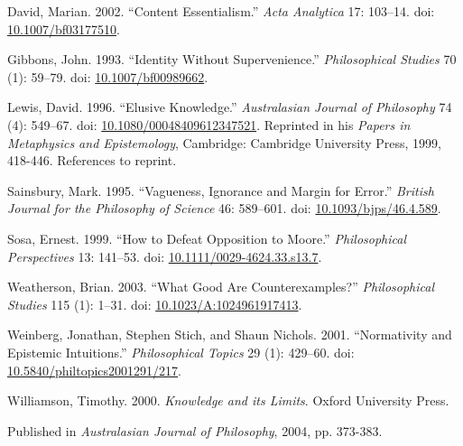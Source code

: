 \documentclass[
  10pt,
  letterpaper,
  DIV=11,
  numbers=noendperiod,
  twoside]{scrartcl}
\newlength{\cslhangindent}
\newenvironment{CSLReferences}[2] %
 {\begin{list}{}{%
  \setlength{\itemindent}{0pt}
  \setlength{\leftmargin}{0pt}
  \setlength{\parsep}{0pt}
  \ifodd #1
   \setlength{\leftmargin}{\cslhangindent}
   \setlength{\itemindent}{-1\cslhangindent}
  \fi
  \setlength{\itemsep}{#2\baselineskip}}}
 {\end{list}}
\begin{document}
\label{refs}
\begin{CSLReferences}{1}{0}
David, Marian. 2002. {``Content Essentialism.''} \emph{Acta Analytica}
17: 103--14. doi:
\href{https://doi.org/10.1007/bf03177510}{10.1007/bf03177510}.

Gibbons, John. 1993. {``Identity Without Supervenience.''}
\emph{Philosophical Studies} 70 (1): 59--79. doi:
\href{https://doi.org/10.1007/bf00989662}{10.1007/bf00989662}.

Lewis, David. 1996. {``Elusive Knowledge.''} \emph{Australasian Journal
of Philosophy} 74 (4): 549--67. doi:
\href{https://doi.org/10.1080/00048409612347521}{10.1080/00048409612347521}.
Reprinted in his \emph{Papers in Metaphysics and Epistemology},
Cambridge: Cambridge University Press, 1999, 418-446. References to
reprint.

Sainsbury, Mark. 1995. {``Vagueness, Ignorance and Margin for Error.''}
\emph{British Journal for the Philosophy of Science} 46: 589--601. doi:
\href{https://doi.org/10.1093/bjps/46.4.589}{10.1093/bjps/46.4.589}.

Sosa, Ernest. 1999. {``How to Defeat Opposition to Moore.''}
\emph{Philosophical Perspectives} 13: 141--53. doi:
\href{https://doi.org/10.1111/0029-4624.33.s13.7}{10.1111/0029-4624.33.s13.7}.

Weatherson, Brian. 2003. {``{What Good Are Counterexamples?}''}
\emph{Philosophical Studies} 115 (1): 1--31. doi:
\href{https://doi.org/10.1023/A:1024961917413}{10.1023/A:1024961917413}.

Weinberg, Jonathan, Stephen Stich, and Shaun Nichols. 2001.
{``Normativity and Epistemic Intuitions.''} \emph{Philosophical Topics}
29 (1): 429--60. doi:
\href{https://doi.org/10.5840/philtopics2001291/217}{10.5840/philtopics2001291/217}.

Williamson, Timothy. 2000. \emph{{Knowledge and its Limits}}. Oxford
University Press.

\end{CSLReferences}



\noindent Published in\emph{
Australasian Journal of Philosophy}, 2004, pp. 373-383.
\end{document}
